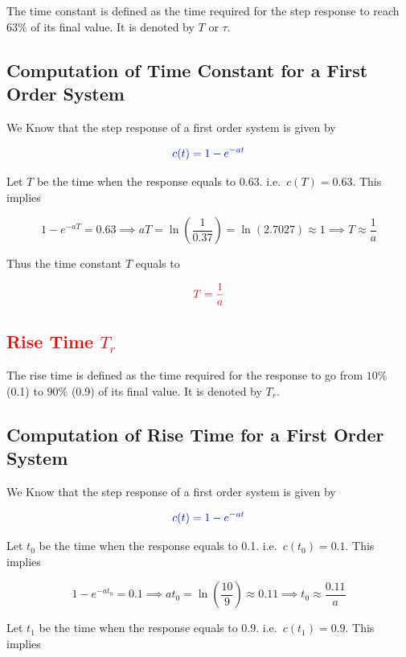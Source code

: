 \documentclass[
  14pt,
  a4paper,
  oneside,
  open=any,
  a4paper,
  14pt]{report}
\begin{document}
The time constant is defined as the time required for the step response
to reach \(63\%\) of its final value. It is denoted by \(T\) or
\(\tau\).

\subsection{Computation of Time Constant for a First Order
System}\label{computation-of-time-constant-for-a-first-order-system}

We Know that the step response of a first order system is given by

\[
    \textcolor{blue}{c(t) = 1 - e^{-at}}
\]

Let \(T\) be the time when the response equals to 0.63.
i.e.~\(c(T) = 0.63\). This implies

\[
    1 - e^{-aT} = 0.63 \implies aT = \ln\left({\dfrac{1}{0.37}}\right) = \ln(2.7027) \approx 1 \implies T \approx \dfrac{1}{a}
\]

Thus the time constant \(T\) equals to

\[
    \textcolor{red}{T = \dfrac{1}{a}}
\]

\subsection{\texorpdfstring{\textcolor{red}{Rise Time
\(T_r\)}}{Rise Time T\_r}}\label{rise-time-t_r}

The rise time is defined as the time required for the response to go
from \(10\%\) (0.1) to \(90\%\) (0.9) of its final value. It is denoted
by \(T_r\).

\subsection{Computation of Rise Time for a First Order
System}\label{computation-of-rise-time-for-a-first-order-system}

We Know that the step response of a first order system is given by

\[
    \textcolor{blue}{c(t) = 1 - e^{-at}}
\]

Let \(t_0\) be the time when the response equals to 0.1.
i.e.~\(c(t_0) = 0.1\). This implies

\[
    1 - e^{-at_0} = 0.1 \implies at_0 = \ln\left({\dfrac{10}{9}}\right) \approx 0.11 \implies t_0 \approx \dfrac{0.11}{a}
\]

Let \(t_1\) be the time when the response equals to 0.9.
i.e.~\(c(t_1) = 0.9\). This implies
\end{document}
